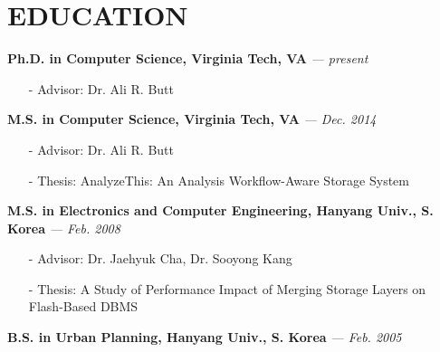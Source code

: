 \section{EDUCATION}
\vspace{0.03in} 
{\bf Ph.D. in Computer Science, Virginia Tech, VA}
{\footnotesize{\it --- present}}
\begin{itemize}[leftmargin=*]
\setlength\itemsep{-0.02in}
  \item[-] {\small Advisor: Dr. Ali R. Butt}
\end{itemize}
\vspace{-0.15in}
{\bf M.S. in Computer Science, Virginia Tech, VA}
{\footnotesize{\it --- Dec. 2014}}
\begin{itemize}[leftmargin=*]
\setlength\itemsep{-0.02in}
  \item[-] {\small Advisor: Dr. Ali R. Butt}
  \item[-] {\small Thesis: AnalyzeThis: An Analysis Workflow-Aware Storage System}
\end{itemize}
\vspace{-0.15in}
{\bf M.S. in Electronics and Computer Engineering, Hanyang Univ., S. Korea}
{\footnotesize{\it --- Feb. 2008}}
\begin{itemize}[leftmargin=*]
\setlength\itemsep{-0.02in}
  \item[-] {\small Advisor: Dr. Jaehyuk Cha, Dr. Sooyong Kang}
  \item[-] {\small Thesis: A Study of Performance Impact of Merging Storage Layers on
  Flash-Based DBMS}
\end{itemize}
\vspace{-0.15in}
{\bf B.S. in Urban Planning, Hanyang Univ., S. Korea}
{\footnotesize{\it --- Feb. 2005}}

